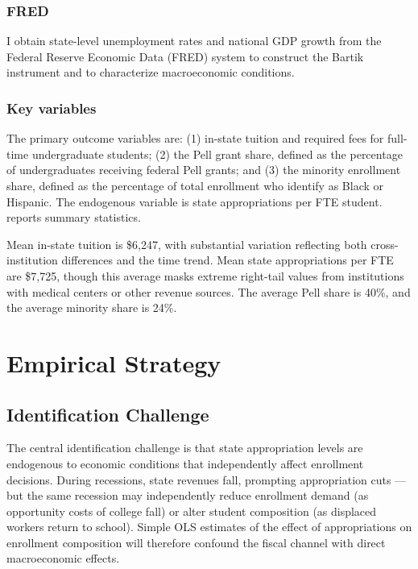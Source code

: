 \documentclass[12pt]{article}
\begin{document}
\subsubsection*{FRED} I obtain state-level unemployment rates and national GDP growth from the Federal Reserve Economic Data (FRED) system to construct the Bartik instrument and to characterize macroeconomic conditions.

\subsubsection*{Key variables} The primary outcome variables are: (1) in-state tuition and required fees for full-time undergraduate students; (2) the Pell grant share, defined as the percentage of undergraduates receiving federal Pell grants; and (3) the minority enrollment share, defined as the percentage of total enrollment who identify as Black or Hispanic. The endogenous variable is state appropriations per FTE student.  reports summary statistics.



Mean in-state tuition is \$6,247, with substantial variation reflecting both cross-institution differences and the time trend. Mean state appropriations per FTE are \$7,725, though this average masks extreme right-tail values from institutions with medical centers or other revenue sources. The average Pell share is 40\%, and the average minority share is 24\%.

\section{Empirical Strategy}
\label{sec:strategy}

\subsection{Identification Challenge}

The central identification challenge is that state appropriation levels are endogenous to economic conditions that independently affect enrollment decisions. During recessions, state revenues fall, prompting appropriation cuts --- but the same recession may independently reduce enrollment demand (as opportunity costs of college fall) or alter student composition (as displaced workers return to school). Simple OLS estimates of the effect of appropriations on enrollment composition will therefore confound the fiscal channel with direct macroeconomic effects.
\end{document}
